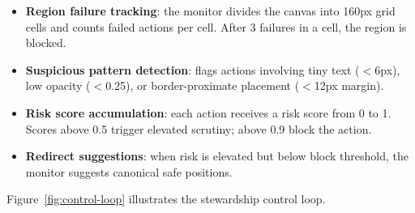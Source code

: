 \documentclass[10pt,twocolumn]{article}
\begin{document}
\begin{itemize}[leftmargin=*,itemsep=1pt]
    \item \textbf{Region failure tracking}: the monitor divides the canvas into 160px grid cells and counts failed actions per cell. After 3 failures in a cell, the region is blocked.
    \item \textbf{Suspicious pattern detection}: flags actions involving tiny text ($<$6px), low opacity ($<$0.25), or border-proximate placement ($<$12px margin).
    \item \textbf{Risk score accumulation}: each action receives a risk score from 0 to 1. Scores above 0.5 trigger elevated scrutiny; above 0.9 block the action.
    \item \textbf{Redirect suggestions}: when risk is elevated but below block threshold, the monitor suggests canonical safe positions.
\end{itemize}

Figure~\ref{fig:control-loop} illustrates the stewardship control loop.
\end{document}
